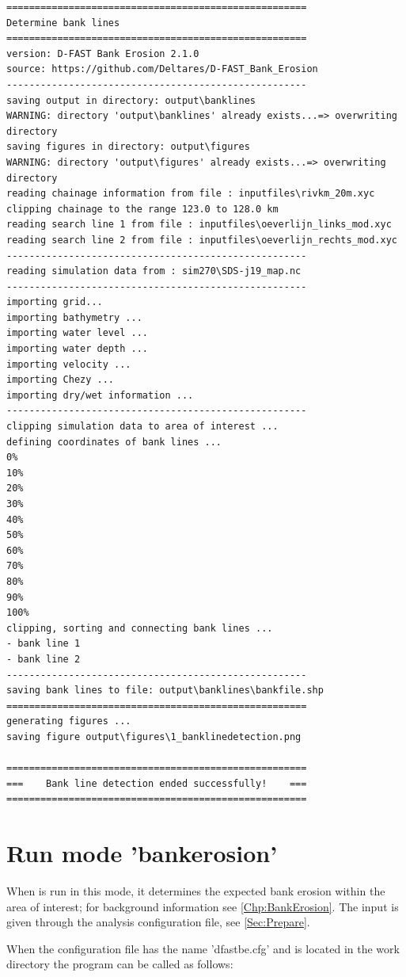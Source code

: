 \begin{Verbatim}
=====================================================
Determine bank lines
=====================================================
version: D-FAST Bank Erosion 2.1.0
source: https://github.com/Deltares/D-FAST_Bank_Erosion
-----------------------------------------------------
saving output in directory: output\banklines
WARNING: directory 'output\banklines' already exists...=> overwriting directory
saving figures in directory: output\figures
WARNING: directory 'output\figures' already exists...=> overwriting directory
reading chainage information from file : inputfiles\rivkm_20m.xyc
clipping chainage to the range 123.0 to 128.0 km
reading search line 1 from file : inputfiles\oeverlijn_links_mod.xyc
reading search line 2 from file : inputfiles\oeverlijn_rechts_mod.xyc
-----------------------------------------------------
reading simulation data from : sim270\SDS-j19_map.nc
-----------------------------------------------------
importing grid...
importing bathymetry ...
importing water level ...
importing water depth ...
importing velocity ...
importing Chezy ...
importing dry/wet information ...
-----------------------------------------------------
clipping simulation data to area of interest ...
defining coordinates of bank lines ...
0%
10%
20%
30%
40%
50%
60%
70%
80%
90%
100%
clipping, sorting and connecting bank lines ...
- bank line 1
- bank line 2
-----------------------------------------------------
saving bank lines to file: output\banklines\bankfile.shp
=====================================================
generating figures ...
saving figure output\figures\1_banklinedetection.png

=====================================================
===    Bank line detection ended successfully!    ===
=====================================================
\end{Verbatim}

\section{Run mode 'bankerosion'} \label{Sec:runerosion}

When \dfastbe is run in this mode, it determines the expected bank erosion within the area of interest; for background information see \autoref{Chp:BankErosion}.
The input is given through the analysis configuration file, see \autoref{Sec:Prepare}.

When the configuration file has the name 'dfastbe.cfg' and is located in the work directory the program can be called as follows:

